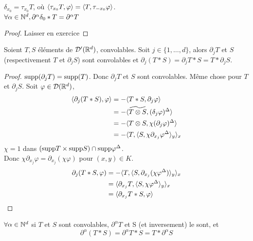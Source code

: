 \documentclass[]{report}
\begin{document}
    \begin{re}{}{}
        $\delta_{x_0}=\tau_{x_0}T$, où $\langle \tau_{x_0}T,\varphi \rangle=\langle T,\tau_{-x_0}\varphi \rangle$.\\
        $\forall \alpha\in \mathbb{N}^d,\partial^\alpha \delta_0*T=\partial^\alpha T$
    \end{re}

    \begin{proof}
        Laisser en exercice
    \end{proof}

    \begin{prop}{}{}
        Soient $T,S$ éléments de $\mathcal{D}'(\mathbb{R}^d)$, convolables. Soit $j\in \{1,\ldots,d\}$, alors $\partial_j T$ et $S$(respectivement $T$ et $\partial_j S$) sont convolables et $\partial_j(T*S)=\partial_j T*S=T*\partial_j S$.
    \end{prop}

    \begin{proof}
        $\text{supp} (\partial_j T)=\text{supp} (T)$. Donc $\partial_j T$ et $S$ sont convolables. Même chose pour $T$ et $\partial_j S$. Soit $\varphi\in \mathcal{D}(\mathbb{R}^d)$,
        \begin{align*}
            \langle \partial_j(T*S),\varphi \rangle&=-\langle T*S,\partial_j\varphi \rangle\\
            &=-\langle \widetilde{T\otimes S},(\delta_j\varphi)^\Delta \rangle\\
            &=-\langle T\otimes S,\chi(\partial_j\varphi)^\Delta \rangle\\
            &=-\langle T,\langle S,\chi\partial_{x_j}\varphi^\Delta \rangle_y \rangle_x
        \end{align*}
        $\chi=1$ dans $(\text{supp} T\times \text{supp} S)\cap \text{supp} \varphi^\Delta$.\\
        Donc $\chi\partial_{x_j}\varphi=\partial_{x_j}(\chi \varphi)$ pour $(x,y)\in K$.
        \begin{align*}
            \partial_j(T*S,\varphi)&=-\langle T,\langle S,\partial_{x_j}(\chi\varphi^\Delta) \rangle_y \rangle_x\\
            &=\langle \partial_{x_j}T,\langle S,\chi\varphi^\Delta \rangle_y \rangle_x\\
            &=\langle \partial_{x_j}T*S,\varphi \rangle
        \end{align*}
    \end{proof}

    \begin{cor}{}{}
        $\forall \alpha\in \mathbb{N}^d$ si $T$ et $S$ sont convolables, $\partial^\alpha T$ et S (et inversement) le sont, et
        \[\partial^\alpha(T*S)=\partial^\alpha T*S=T*\partial^\alpha S\]
    \end{cor}
\end{document}
